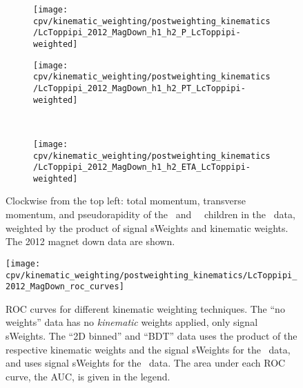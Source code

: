 \begin{figure}
  \begin{subfigure}[b]{0.5\textwidth}
    \centering
    \texttt{[image: cpv/kinematic\_weighting/postweighting\_kinematics/LcToppipi\_2012\_MagDown\_h1\_h2\_P\_LcToppipi-weighted]}
    \label{fig:cpv:kinematic_weighting:post:ppipi_h1h2:P}
  \end{subfigure}
  \begin{subfigure}[b]{0.5\textwidth}
    \centering
    \texttt{[image: cpv/kinematic\_weighting/postweighting\_kinematics/LcToppipi\_2012\_MagDown\_h1\_h2\_PT\_LcToppipi-weighted]}
    \label{fig:cpv:kinematic_weighting:post:ppipi_h1h2:PT}
  \end{subfigure}\\
  \begin{subfigure}[b]{\textwidth}
    \centering
    \texttt{[image: cpv/kinematic\_weighting/postweighting\_kinematics/LcToppipi\_2012\_MagDown\_h1\_h2\_ETA\_LcToppipi-weighted]}
    \label{fig:cpv:kinematic_weighting:post:ppipi_h1h2:ETA}
  \end{subfigure}
  \caption{%
    Clockwise from the top left: total momentum, transverse momentum, and 
    pseudorapidity of the \Ppiminus\ and \Ppiplus\ \PLambdac\ children in the 
    \ppipi\ data, weighted by the product of signal sWeights and kinematic 
    weights.
    The 2012 magnet down data are shown.
  }
  \label{fig:cpv:kinematic_weighting:post:ppipi_h1h2}
\end{figure}

\begin{figure}
  \texttt{[image: cpv/kinematic\_weighting/postweighting\_kinematics/LcToppipi\_2012\_MagDown\_roc\_curves]}
  \caption{%
    ROC curves for different kinematic weighting techniques.
    The ``no weights'' data has no \emph{kinematic} weights applied, only 
    signal sWeights.
    The ``2D binned'' and ``\ac{BDT}'' data uses the product of the respective 
    kinematic weights and the signal sWeights for the \ppipi\ data, and uses
    signal sWeights for the \pKK\ data.
    The area under each \ac{ROC} curve, the \acs{AUC}, is given in the legend.
  }
  \label{fig:cpv:kinematic_weighting:post:roc}
\end{figure}
